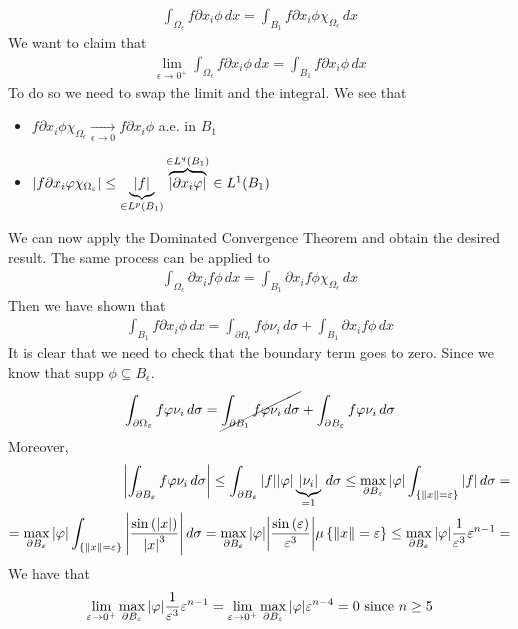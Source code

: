 \[
    \begin{split}
        \int_{\Omega_\epsilon} f \partial x_i \phi \, dx = \int_{B_1} f \partial x_i \phi \chi_{\Omega_\epsilon} \, dx
    \end{split}
\]
We want to claim that 
\[
    \begin{split}
        \lim_{\epsilon \to 0^+} \int_{\Omega_\epsilon} f \partial x_i \phi \, dx = \int_{B_1} f \partial x_i \phi \, dx
    \end{split}
\]
To do so we need to swap the limit and the integral. We see that 
\begin{itemize}
    \item \(f \partial x_i \phi \chi_{\Omega_\epsilon} \underset{\epsilon \to 0}{\longrightarrow} f \partial x_i \phi\) a.e. in \(B_1\)
    \item \(\abs{f \partial x_i \phi \chi_{\Omega_\epsilon}} \leq \underbrace{\abs{f}}_{\in L^p(B_1)} \overbrace{\abs{\partial x_i \phi}}^{\in L^q(B_1)} \in L^1(B_1)\)
\end{itemize}
We can now apply the Dominated Convergence Theorem and obtain the desired result. 
The same process can be applied to
\[
    \begin{split}
        \int_{\Omega_\epsilon} \partial x_i f \phi \, dx = \int_{B_1} \partial x_i f \phi \chi_{\Omega_\epsilon} \, dx
    \end{split}
\]
Then we have shown that 
\[
    \begin{split}
        \int_{B_1} f \partial x_i \phi \, dx = \int_{\partial\Omega_\epsilon} f \phi \nu_i \, d\sigma + \int_{B_1} \partial x_i f \phi \, dx
    \end{split}
\]
It is clear that we need to check that the boundary term goes to zero. Since we know that \(\text{supp } \phi \subseteq B_\epsilon\).
\[
    \begin{split}
        \int_{\partial\Omega_\epsilon} f \phi \nu_i \, d\sigma = \cancel{\int_{\partial B_1} f \phi \nu_i \, d\sigma} + \int_{\partial B_\epsilon} f \phi \nu_i \, d\sigma
    \end{split}
\]
Moreover,
\[
    \begin{split}
        \abs{\int_{\partial B_\epsilon} f \phi \nu_i \, d\sigma} \leq \int_{\partial B_\epsilon} \abs{f} \abs{\phi} \underbrace{\abs{\nu_i}}_{=1} \, d\sigma \leq \max_{\partial B_\epsilon} \abs{\phi} \int_{\{ \norm{x} = \epsilon \}} \abs{f} \, d\sigma = \\
        = \max_{\partial B_\epsilon} \abs{\phi} \int_{\{ \norm{x} = \epsilon \}} \abs{\frac{\sin\left(\abs{x}\right)}{\abs{x}^3}} \, d\sigma = \max_{\partial B_\epsilon} \abs{\phi}  \abs{\frac{\sin\left(\epsilon\right)}{\epsilon^3}} \mu\left\{\norm{x} = \epsilon\right\} \leq \max_{\partial B_\epsilon} \abs{\phi} \frac{1}{\epsilon^3} \epsilon^{n-1} = \\ 
    \end{split}
\]
We have that 
\[
    \begin{split}
        \lim_{\epsilon \to 0^+} \max_{\partial B_\epsilon} \abs{\phi} \frac{1}{\epsilon^3} \epsilon^{n-1} = \lim_{\epsilon \to 0^+} \max_{\partial B_\epsilon} \abs{\phi} \epsilon^{n-4} = 0 \text{ since } n \geq 5
    \end{split}
\]

